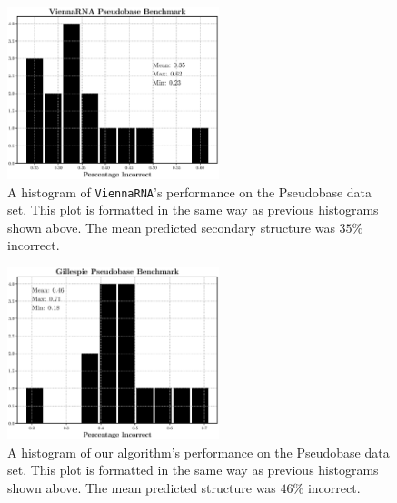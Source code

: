 \documentclass[11pt]{article}
\begin{document}
\begin{multicols}{2}
\begin{figure}[H]
    \centering
    \includegraphics[width = 0.55\textwidth]{fig/v_rna_pseudo.eps}
    \caption{A histogram of \texttt{ViennaRNA}'s performance on the Pseudobase data set. This plot is formatted in the same way as previous histograms shown above. The mean predicted secondary structure was $35\%$ incorrect.}
    \label{fig:v_pseudo}
\end{figure}

\begin{figure}[H]
    \centering 
    \includegraphics[width = 0.55\textwidth]{fig/gill_pseudo.eps}
    \caption{A histogram of our algorithm's performance on the Pseudobase data set. This plot is formatted in the same way as previous histograms shown above. The mean predicted structure was $46\%$ incorrect.}
    \label{fig:gill_pseudo}
\end{figure}
\end{multicols}
\end{document}
